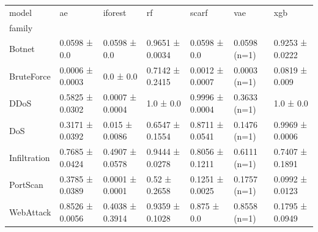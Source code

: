 \begin{tabular}{lllllll}
\toprule
model & ae & iforest & rf & scarf & vae & xgb \\
family &  &  &  &  &  &  \\
\midrule
Botnet & 0.0598 ± 0.0 & 0.0598 ± 0.0 & 0.9651 ± 0.0034 & 0.0598 ± 0.0 & 0.0598 (n=1) & 0.9253 ± 0.0222 \\
BruteForce & 0.0006 ± 0.0003 & 0.0 ± 0.0 & 0.7142 ± 0.2415 & 0.0012 ± 0.0007 & 0.0003 (n=1) & 0.0819 ± 0.009 \\
DDoS & 0.5825 ± 0.0302 & 0.0007 ± 0.0004 & 1.0 ± 0.0 & 0.9996 ± 0.0004 & 0.3633 (n=1) & 1.0 ± 0.0 \\
DoS & 0.3171 ± 0.0392 & 0.015 ± 0.0086 & 0.6547 ± 0.1554 & 0.8711 ± 0.0541 & 0.1476 (n=1) & 0.9969 ± 0.0006 \\
Infiltration & 0.7685 ± 0.0424 & 0.4907 ± 0.0578 & 0.9444 ± 0.0278 & 0.8056 ± 0.1211 & 0.6111 (n=1) & 0.7407 ± 0.1891 \\
PortScan & 0.3785 ± 0.0389 & 0.0001 ± 0.0001 & 0.52 ± 0.2658 & 0.1251 ± 0.0025 & 0.1757 (n=1) & 0.0992 ± 0.0123 \\
WebAttack & 0.8526 ± 0.0056 & 0.4038 ± 0.3914 & 0.9359 ± 0.1028 & 0.875 ± 0.0 & 0.8558 (n=1) & 0.1795 ± 0.0949 \\
\bottomrule
\end{tabular}
